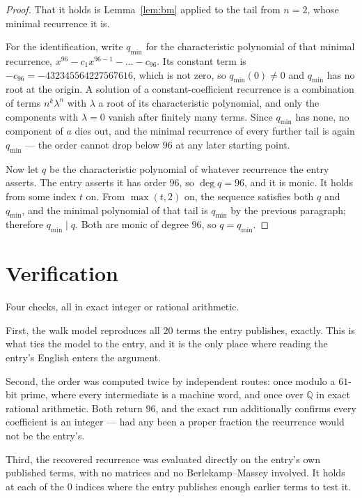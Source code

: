 \documentclass[11pt,a4paper]{article}
\theoremstyle{plain}
\theoremstyle{definition}
\begin{document}
\begin{proof}
That it holds is Lemma~\ref{lem:bm} applied to the tail from $n=2$, whose minimal
recurrence it is.

For the identification, write $q_{\min}$ for the characteristic polynomial of that minimal
recurrence, $x^{96}-c_1x^{96-1}-\dots-c_{96}$. Its constant term is
$-c_{96}=-432345564227567616$, which is not zero, so $q_{\min}(0)\neq0$ and $q_{\min}$ has no
root at the origin. A solution of a constant-coefficient recurrence is a combination of terms
$n^{k}\lambda^{n}$ with $\lambda$ a root of its characteristic polynomial, and only the
components with $\lambda=0$ vanish after finitely many terms. Since $q_{\min}$ has none, no
component of $a$ dies out, and the minimal recurrence of every further tail is again
$q_{\min}$ --- the order cannot drop below $96$ at any later starting point.

Now let $q$ be the characteristic polynomial of whatever recurrence the entry asserts. The
entry asserts it has order $96$, so $\deg q=96$, and it is monic. It holds from some
index $t$ on. From $\max(t,2)$ on, the sequence satisfies both $q$ and $q_{\min}$, and
the minimal polynomial of that tail is $q_{\min}$ by the previous paragraph; therefore
$q_{\min}\mid q$. Both are monic of degree $96$, so $q=q_{\min}$.
\end{proof}

\section{Verification}

Four checks, all in exact integer or rational arithmetic.

First, the walk model reproduces all $20$ terms the entry publishes, exactly. This is
what ties the model to the entry, and it is the only place where reading the entry's English
enters the argument.

Second, the order was computed twice by independent routes: once modulo a $61$-bit prime, where
every intermediate is a machine word, and once over $\mathbb{Q}$ in exact rational arithmetic.
Both return $96$, and the exact run additionally confirms every coefficient is an integer
--- had any been a proper fraction the recurrence would not be the entry's.

Third, the recovered recurrence was evaluated directly on the entry's own published terms, with
no matrices and no Berlekamp--Massey involved. It holds at each of the $0$ indices where
the entry publishes enough earlier terms to test it.
\end{document}
